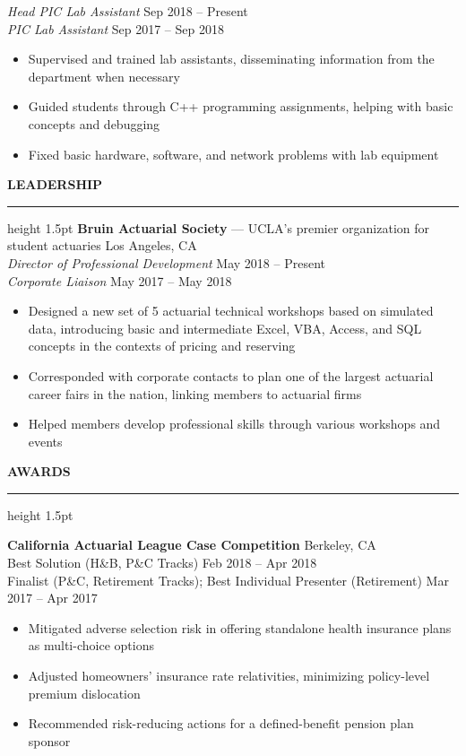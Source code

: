 \documentclass[11pt,letterpaper]{article}
\newcommand{\sectline}{\vspace{4pt}\hrule height 1.5pt\vspace{4pt}}
\newcommand{\sectspace}{\vspace{8pt}}
\begin{document}
\textit{Head PIC Lab Assistant} \hfill Sep 2018 -- Present \\
\textit{PIC Lab Assistant} \hfill Sep 2017 -- Sep 2018
\begin{itemize}
	\item Supervised and trained lab assistants, disseminating information from the department when necessary
	\item Guided students through C++ programming assignments, helping with basic concepts and debugging
	\item Fixed basic hardware, software, and network problems with lab equipment
\end{itemize}
\sectspace


\textbf{LEADERSHIP} \sectline
\textbf{Bruin Actuarial Society} --- UCLA's premier organization for student actuaries \hfill Los Angeles, CA \\
\textit{Director of Professional Development} \hfill May 2018 -- Present \\
\textit{Corporate Liaison} \hfill May 2017 -- May 2018
\begin{itemize}
	\item Designed a new set of 5 actuarial technical workshops based on simulated data, introducing basic and intermediate Excel, VBA, Access, and SQL concepts in the contexts of pricing and reserving
	\item Corresponded with corporate contacts to plan one of the largest actuarial career fairs in the nation, linking members to actuarial firms
	\item Helped members develop professional skills through various workshops and events
\end{itemize}
\sectspace

\textbf{AWARDS} \sectline

\textbf{California Actuarial League Case Competition} \hfill Berkeley, CA \\
Best Solution (H\&B, P\&C Tracks) \hfill Feb 2018 -- Apr 2018 \\
Finalist (P\&C, Retirement Tracks); Best Individual Presenter (Retirement) \hfill Mar 2017 -- Apr 2017 
\begin{itemize}
	\item Mitigated adverse selection risk in offering standalone health insurance plans as multi-choice options
	\item Adjusted homeowners' insurance rate relativities, minimizing policy-level premium dislocation 
	\item Recommended risk-reducing actions for a defined-benefit pension plan sponsor
\end{itemize}
\end{document}
